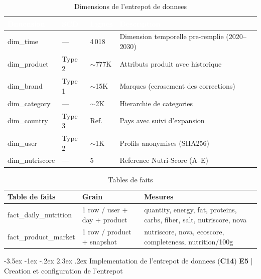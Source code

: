 \documentclass[a4paper,11pt,oneside,openany]{report}
\makeatletter
\renewcommand\section{\@startsection{section}{1}{\z@}%
  {-3.5ex \@plus -1ex \@minus -.2ex}%
  {2.3ex \@plus.2ex}%
  {\normalfont\Large\bfseries\color{ntgreen}}}
\newcommand{\competence}[1]{\textbf{\textcolor{ntgreen}{#1}}}
\newcommand{\evaluation}[1]{\textbf{\textcolor{ntblue}{#1}}}
\makeatother
\begin{document}
\begin{table}[H]
\centering
\caption{Dimensions de l'entrepot de donnees}
\label{tab:dimensions}
\begin{tabularx}{\textwidth}{L{2.5cm} C{1.5cm} C{1.2cm} L{6.5cm}}
\toprule
{}
\textcolor{white}{\textbf{Dimension}} & \textcolor{white}{\textbf{SCD}} & \textcolor{white}{\textbf{Lignes}} & \textcolor{white}{\textbf{Description}} \\
\midrule
dim\_time & --- & 4\,018 & Dimension temporelle pre-remplie (2020--2030) \\
dim\_product & Type 2 & $\sim$777K & Attributs produit avec historique \\
dim\_brand & Type 1 & $\sim$15K & Marques (ecrasement des corrections) \\
dim\_category & --- & $\sim$2K & Hierarchie de categories \\
dim\_country & Type 3 & Ref. & Pays avec suivi d'expansion \\
dim\_user & Type 2 & $\sim$1K & Profils anonymises (SHA256) \\
dim\_nutriscore & --- & 5 & Reference Nutri-Score (A--E) \\
\bottomrule
\end{tabularx}
\end{table}

\begin{table}[H]
\centering
\caption{Tables de faits}
\label{tab:facts}
\begin{tabularx}{\textwidth}{L{3.5cm} L{4cm} L{5.5cm}}
\toprule
\textbf{Table de faits} & \textbf{Grain} & \textbf{Mesures} \\
\midrule
fact\_daily\_nutrition & 1 row / user + day + product & quantity, energy, fat, proteins, carbs, fiber, salt, nutriscore, nova \\
fact\_product\_market & 1 row / product + snapshot & nutriscore, nova, ecoscore, completeness, nutrition/100g \\
\bottomrule
\end{tabularx}
\end{table}


\section{Implementation de l'entrepot de donnees (\competence{C14})}
\label{sec:c14}
{\small\evaluation{E5} | Creation et configuration de l'entrepot}
\end{document}
